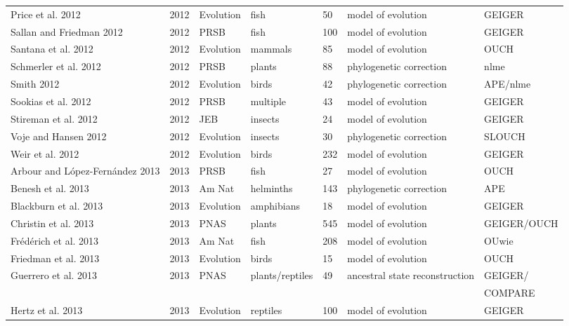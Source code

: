 \documentclass[a4paper,12pt]{article}
\begin{document}
\begin{landscape}
\begin{center}
\begin{longtable}{p{6cm}llllll}
Price et al. 2012 &   2012    &   Evolution   &   fish    &   50  &   model of evolution  &   GEIGER  \\
Sallan and Friedman 2012  &   2012    &   PRSB    &   fish    &   100 &   model of evolution  &   GEIGER  \\
Santana et al. 2012   &   2012    &   Evolution   &   mammals &   85  &   model of evolution  &   OUCH    \\
Schmerler et al. 2012 &   2012    &   PRSB    &   plants  &   88  &   phylogenetic correction &   nlme    \\
Smith 2012    &   2012    &   Evolution   &   birds   &   42  &   phylogenetic correction &   APE/nlme    \\
Sookias et al. 2012   &   2012    &   PRSB    &   multiple    &   43  &   model of evolution  &   GEIGER  \\
Stireman et al. 2012  &   2012    &   JEB &   insects &   24  &   model of evolution  &   GEIGER  \\
Voje and Hansen 2012  &   2012    &   Evolution   &   insects &   30  &   phylogenetic correction &   SLOUCH  \\
Weir et al. 2012  &   2012    &   Evolution   &   birds   &   232 &   model of evolution  &   GEIGER  \\
Arbour and L\'{o}pez-Fern\'{a}ndez 2013   &   2013    &   PRSB    &   fish    &   27  &   model of evolution  &   OUCH    \\
Benesh et al. 2013    &   2013    &   Am Nat  &   helminths   &   143 &   phylogenetic correction &   APE \\
Blackburn et al. 2013 &   2013    &   Evolution   &   amphibians  &   18  &   model of evolution  &   GEIGER  \\
Christin et al. 2013  &   2013    &   PNAS    &   plants  &   545 &   model of evolution  &   GEIGER/OUCH \\
Fr\'{e}d\'{e}rich et al. 2013 &   2013    &   Am Nat  &   fish    &   208 &   model of evolution  &   OUwie   \\
Friedman et al. 2013  &   2013    &   Evolution   &   birds   &   15  &   model of evolution  &   OUCH    \\
Guerrero et al. 2013  &   2013    &   PNAS    &   plants/reptiles &   49  &   ancestral state reconstruction  &   GEIGER/ \\
    &       &       &       &       &       &   COMPARE \\
Hertz et al. 2013 &   2013    &   Evolution   &   reptiles    &   100 &   model of evolution  &   GEIGER  \\

\end{longtable}
\end{center}
\end{landscape}
\end{document}
